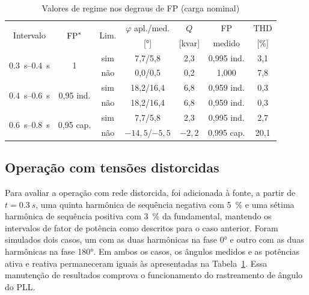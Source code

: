 \begin{table}[!t]\centering\footnotesize\setlength{\tabcolsep}{3pt}
\caption{Valores de regime nos degraus de FP (carga nominal)}\label{tab:res}
\begin{tabular}{@{}ccccccc@{}}\toprule
\multirow{2}{*}{Intervalo} & \multirow{2}{*}{$\mathrm{FP}^*$} & \multirow{2}{*}{Lim.} & $\varphi$ apl./med. & $Q$ & FP & THD\\
 & & & [\si{\degree}] & [kvar] & medido & [\%]\\\midrule
\multirow{2}{*}{\SIrange{0,3}{0,4}{s}} & \multirow{2}{*}{1} & sim & 7,7/5,8 & 2,3 & 0,995 ind. & 3,1\\
 & & não & 0,0/0,5 & 0,2 & 1,000 & 7,8\\\midrule
\multirow{2}{*}{\SIrange{0,4}{0,6}{s}} & \multirow{2}{*}{0,95 ind.} & sim & 18,2/16,4 & 6,8 & 0,959 ind. & 0,3\\
 & & não & 18,2/16,4 & 6,8 & 0,959 ind. & 0,3\\\midrule
\multirow{2}{*}{\SIrange{0,6}{0,8}{s}} & \multirow{2}{*}{0,95 cap.} & sim & 7,7/5,8 & 2,3 & 0,995 ind. & 2,7\\
 & & não & $-14{,}5$/$-5{,}5$ & $-2{,}2$ & 0,995 cap. & 20,1\\\bottomrule
\end{tabular}\end{table}

\subsection{Operação com tensões distorcidas}

Para avaliar a operação com rede distorcida, foi adicionada à fonte, a partir de $t=\SI{0,3}{s}$, uma quinta harmônica de sequência negativa com \SI{5}{\percent} e
uma sétima harmônica de sequência positiva com \SI{3}{\percent} da fundamental, mantendo os intervalos de fator de potência como descritos para o caso anterior. Foram
simulados dois casos, um com as duas harmônicas na fase \ang{0} e outro com as duas harmônicas na fase \ang{180}. Em ambos os casos, os ângulos medidos e
as potências ativa e reativa permaneceram iguais às apresentadas na Tabela~\ref{tab:res}. Essa manutenção de resultados comprova o funcionamento
do rastreamento de ângulo do PLL.

